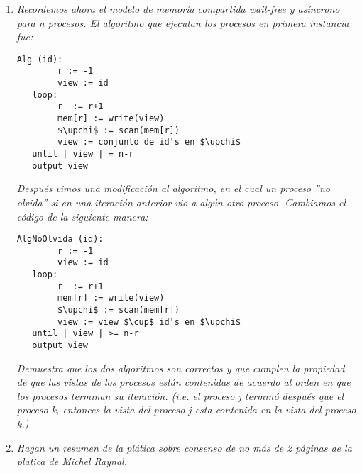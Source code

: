 \documentclass{article}
\begin{document}
\begin{enumerate}
  \item{
      \textsl{
        Recordemos ahora el modelo de memoría compartida wait-free y
        asíncrono para n procesos. El algoritmo que ejecutan los
        procesos en primera instancia fue:
      }
      \begin{lstlisting}[frame=single,mathescape]
Alg (id):
        r := -1
        view := id
   loop:
        r  := r+1
        mem[r] := write(view)
        $\upchi$ := scan(mem[r])
        view := conjunto de id's en $\upchi$
   until | view | = n-r
   output view
      \end{lstlisting}
      \textsl{
        Después vimos una modificación al algoritmo, en el cual un
        proceso ''no olvida'' si en una iteración anterior vio a algún
        otro proceso. Cambiamos el código de la siguiente manera:
      }
\begin{lstlisting}[frame=single,mathescape]
AlgNoOlvida (id):
        r := -1
        view := id
   loop:
        r  := r+1
        mem[r] := write(view)
        $\upchi$ := scan(mem[r])
        view := view $\cup$ id's en $\upchi$
   until | view | >= n-r
   output view
      \end{lstlisting}
      \textsl{
        Demuestra que los dos algoritmos son correctos y que cumplen
        la propiedad de que las vistas de los procesos están
        contenidas de acuerdo al orden en que los procesos terminan su
        iteración. (i.e. el proceso j terminó después que el proceso
        k, entonces la vista del proceso j esta contenida en la vista
        del proceso k.)
      }
    }

  \item{
      \textsl{
        Hagan un resumen de la plática sobre consenso de no más de 2
        páginas de la platica de Michel Raynal.
      }

}
\end{enumerate}
\end{document}
